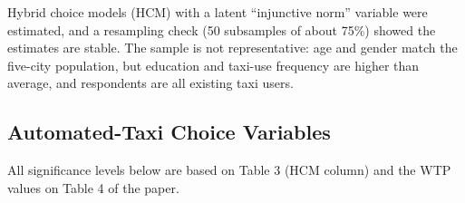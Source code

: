 \documentclass[10pt,a4paper]{article}
\begin{document}
Hybrid choice models (HCM) with a latent ``injunctive norm'' variable were estimated, and a resampling check (50 subsamples of about 75\%) showed the estimates are stable. The sample is not representative: age and gender match the five-city population, but education and taxi-use frequency are higher than average, and respondents are all existing taxi users.

\hypertarget{automated-taxi-choice-variables}{%
\subsection{Automated-Taxi Choice Variables}\label{automated-taxi-choice-variables}}

All significance levels below are based on Table 3 (HCM column) and the WTP values on Table 4 of the paper.
\end{document}
